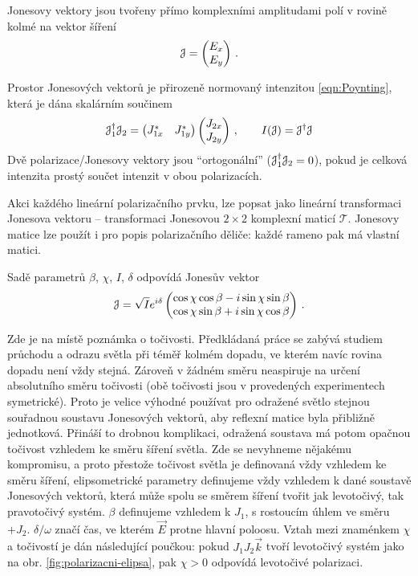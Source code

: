 Jonesovy vektory\cite{azzamEllipsometryPolarizedLight1977} jsou tvořeny přímo komplexními amplitudami polí v rovině kolmé na vektor šíření
\begin{equation}
    \mathcal{J}=\begin{pmatrix} E_{x} \\ E_{y} \end{pmatrix} \,.
\end{equation}

Prostor Jonesových vektorů je přirozeně normovaný intenzitou \eqref{eqn:Poynting}, která je dána skalárním součinem
\begin{equation}
    \mathcal{J}_1^\dagger \mathcal{J}_2= \begin{pmatrix} J_{1x}^* & J_{1y}^* \end{pmatrix}
    \begin{pmatrix} J_{2x} \\ J_{2y} \end{pmatrix} \,, 
    \qquad I(\mathcal{J})=\mathcal{J}^\dagger \mathcal{J}
\end{equation}
Dvě polarizace/Jonesovy vektory jsou ``ortogonální'' ($\mathcal{J}_1^\dagger \mathcal{J}_2=0$), pokud je celková intenzita prostý součet intenzit v obou polarizacích.

Akci každého lineární polarizačního prvku, lze popsat jako lineární transformaci Jonesova vektoru -- transformaci Jonesovou $2\times 2$ komplexní maticí $\mathcal{T}$.
Jonesovy matice lze použít i pro popis polarizačního děliče: každé rameno pak má vlastní matici.

Sadě parametrů $\beta$, $\chi$, $I$, $\delta$ odpovídá Jonesův vektor
\begin{equation} 
\label{eqn:Jones-elipsa}
    \mathcal{J}=\sqrt{I} e^{i\delta} \begin{pmatrix}
        \cos \chi \cos \beta - i \sin \chi \sin \beta \\
        \cos \chi \sin \beta + i \sin \chi \cos \beta
    \end{pmatrix} \,.
\end{equation}

Zde je na místě poznámka o točivosti.
Předkládaná práce se zabývá studiem průchodu a odrazu světla při téměř kolmém dopadu, ve kterém navíc rovina dopadu není vždy stejná.
Zároveň v žádném směru neaspiruje na určení absolutního směru točivosti (obě točivosti jsou v provedených experimentech symetrické).
Proto je velice výhodné používat pro odražené světlo stejnou souřadnou soustavu Jonesových vektorů, aby reflexní matice byla přibližně jednotková.
Přináší to drobnou komplikaci, odražená soustava má potom opačnou točivost vzhledem ke směru šíření světla.
Zde se nevyhneme nějakému kompromisu, a proto přestože točivost světla je definovaná vždy vzhledem ke směru šíření, elipsometrické parametry definujeme vždy vzhledem k dané soustavě Jonesových vektorů, která může spolu se směrem šíření tvořit jak levotočivý, tak pravotočivý systém.
$\beta$ definujeme vzhledem k $J_1$, s rostoucím úhlem ve směru $+J_2$.
$\delta/\omega$ značí čas, ve kterém $\vec{E}$ protne hlavní poloosu. 
Vztah mezi znaménkem $\chi$ a točivostí je dán následující poučkou: pokud $J_1 J_2 \vec{k}$ tvoří levotočivý systém jako na obr. \ref{fig:polarizacni-elipsa}, pak $\chi>0$ odpovídá levotočivé polarizaci.

